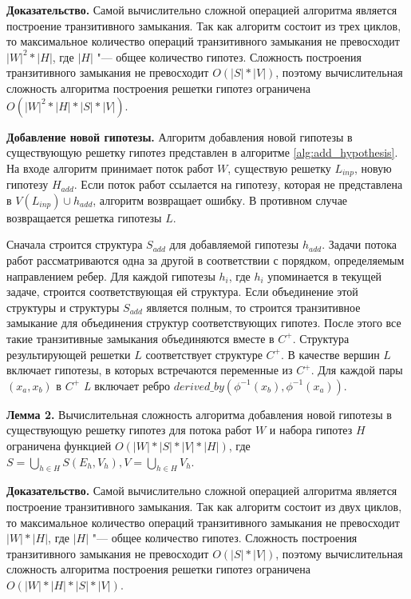 \textbf{Доказательство.} Самой вычислительно сложной операцией алгоритма является построение транзитивного замыкания. 
Так как алгоритм состоит из трех циклов, то максимальное количество операций транзитивного замыкания не превосходит 
$|W|^2*|H|$, где $|H|$ "--- общее количество гипотез. Сложность построения транзитивного замыкания не превосходит 
$O\left(|S|*|V|\right)$, поэтому вычислительная сложность алгоритма построения решетки гипотез ограничена 
$O\left(|W|^2*|H|*|S|*|V|\right)$.

\textbf{Добавление новой гипотезы.} Алгоритм добавления новой гипотезы в существующую решетку гипотез представлен 
в алгоритме \ref{alg:add_hypothesis}. На входе алгоритм принимает поток работ $W$, существую решетку $L_{inp}$, 
новую гипотезу $H_{add}$. Если поток работ ссылается на гипотезу, которая не представлена в 
$V\left(L_{inp}\right) \cup h_{add}$, алгоритм возвращает ошибку. В противном случае возвращается решетка гипотезы $L$.  

Сначала строится структура $S_{add}$ для добавляемой гипотезы $h_{add}$. Задачи потока работ рассматриваются одна 
за другой в соответствии с порядком, определяемым направлением ребер. Для каждой гипотезы $h_i$, где $h_i$ упоминается 
в текущей задаче, строится соответствующая ей структура. Если объединение этой структуры и структуры $S_{add}$ является 
полным, то строится транзитивное замыкание для объединения структур соответствующих гипотез. После этого все такие 
транзитивные замыкания объединяются вместе в $C^+$. Структура результирующей решетки $L$ соответствует структуре $C^+$. 
В качестве вершин $L$ включает гипотезы, в которых встречаются переменные из $C^+$. Для каждой пары 
$\left(x_a, x_b\right)$ в $C^+$ \textit{L} включает ребро 
$derived\_by \left(\phi^{-1}\left(x_b\right), \phi^{-1}\left(x_a\right)\right)$.

\textbf{Лемма 2.} Вычислительная сложность алгоритма добавления новой гипотезы в существующую решетку гипотез для 
потока работ $W$ и набора гипотез $H$ ограничена функцией $ O\left( |W| * |S| * |V| * |H| \right)$, 
где $S = \bigcup\limits_{h \in H} S\left(E_h, V_h \right), V = \bigcup\limits_{h \in H} V_h$.

\textbf{Доказательство.} Самой вычислительно сложной операцией алгоритма является построение транзитивного замыкания. 
Так как алгоритм состоит из двух циклов, то максимальное количество операций транзитивного замыкания не превосходит 
$|W|*|H|$, где $|H|$ "--- общее количество гипотез. Сложность построения транзитивного замыкания не превосходит 
$O\left(|S|*|V|\right)$, поэтому вычислительная сложность алгоритма построения решетки гипотез ограничена 
$O\left(|W|*|H|*|S|*|V|\right)$.


